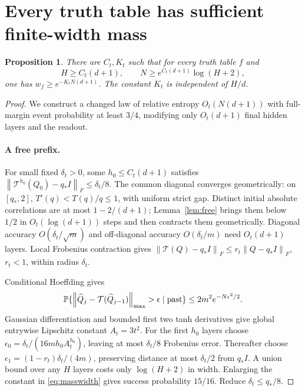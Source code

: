 \documentclass[11pt]{article}
\newtheorem{proposition}[theorem]{Proposition}
\newcommand{\norm}[1]{\left\lVert#1\right\rVert}
\begin{document}
\section{Every truth table has sufficient finite-width mass}
\begin{proposition}\label{prop:mass}
There are $C_t,K_t$ such that for every truth table $f$ and
\begin{equation}\label{eq:masswidth}
 H\ge C_t(d+1),\qquad N\ge e^{C_t(d+1)}\log(H+2),
\end{equation}
one has $w_f\ge e^{-K_tN(d+1)}$. The constant $K_t$ is independent of $H/d$.
\end{proposition}
\begin{proof}
We construct a changed law of relative entropy $O_t(N(d+1))$ with full-margin event probability at least $3/4$, modifying only $O_t(d+1)$ final hidden layers and the readout.

\paragraph{A free prefix.}
For small fixed $\delta_t>0$, some $h_0\le C_t(d+1)$ satisfies
$\norm{\mathcal T^{h_0}(Q_0)-q_*I}_F\le\delta_t/8$. The common diagonal converges geometrically: on $[q_*,2]$, $T'(q)<T(q)/q\le1$, with uniform strict gap. Distinct initial absolute correlations are at most $1-2/(d+1)$; Lemma~\ref{lem:free} brings them below $1/2$ in $O_t(\log(d+1))$ steps and then contracts them geometrically. Diagonal accuracy $O(\delta_t/\sqrt m)$ and off-diagonal accuracy $O(\delta_t/m)$ need $O_t(d+1)$ layers. Local Frobenius contraction gives
$\norm{\mathcal T(Q)-q_*I}_F\le r_t\norm{Q-q_*I}_F$, $r_t<1$, within radius $\delta_t$.

Conditional Hoeffding gives
\[
 \Pp\{\norm{\widehat Q_j-\mathcal T(\widehat Q_{j-1})}_{\max}>\epsilon\mid\text{past}\}
 \le2m^2e^{-N\epsilon^2/2}.
\]
Gaussian differentiation and bounded first two tanh derivatives give global entrywise Lipschitz constant $A_t=3t^2$. For the first $h_0$ layers choose $\epsilon_0=\delta_t/(16mh_0A_t^{h_0})$, leaving at most $\delta_t/8$ Frobenius error. Thereafter choose $\epsilon_1=(1-r_t)\delta_t/(4m)$, preserving distance at most $\delta_t/2$ from $q_*I$. A union bound over any $H$ layers costs only $\log(H+2)$ in width. Enlarging the constant in \eqref{eq:masswidth} gives success probability $15/16$. Reduce $\delta_t\le q_*/8$.


\end{proof}
\end{document}
